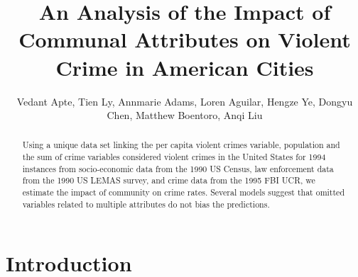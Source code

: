 \documentclass[letterpaper, 11 pt, conference]{article}
\title{An Analysis of the Impact of Communal Attributes on Violent Crime in American Cities}
\author{Vedant Apte, Tien Ly, Annmarie Adams, Loren Aguilar, Hengze Ye, Dongyu Chen, Matthew Boentoro, Anqi Liu}
\begin{document}
\maketitle

\begin{abstract}
Using a unique data set linking the per capita violent crimes variable, population and the sum of crime variables considered violent crimes in the United States for 1994 instances from socio-economic data from the 1990 US Census, law enforcement data from the 1990 US LEMAS survey, and crime data from the 1995 FBI UCR, we estimate the impact of community on crime rates. Several models suggest that omitted variables related to multiple attributes do not bias the predictions.
\end{abstract}

\section{Introduction}
\end{document}
